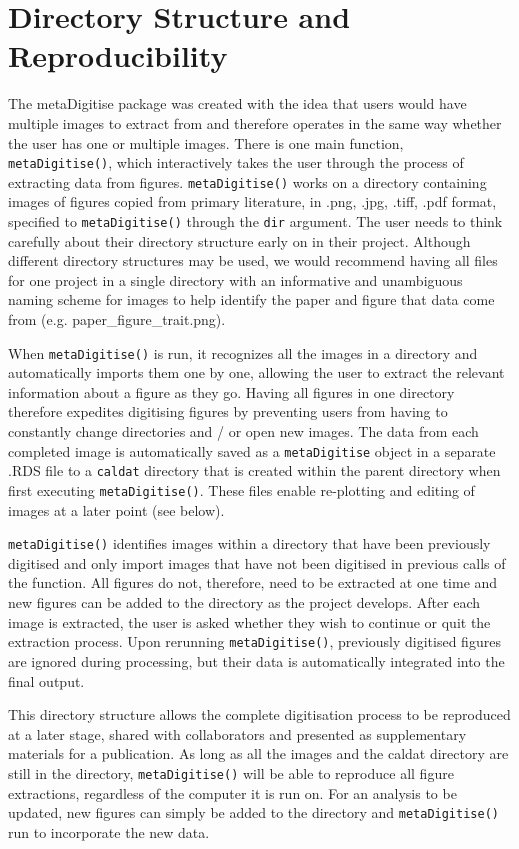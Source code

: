 \documentclass[12pt]{article}
\newcommand{\code}[1]{\texttt{#1}}
\newcommand{\fct}[1]{\texttt{#1()}}
\newcommand{\pkg}[1]{{\fontseries{b}\selectfont #1}}
\begin{document}
\section{Directory Structure and Reproducibility}
The \pkg{metaDigitise} package was created with the idea that users would have multiple images to extract from and therefore operates in the same way whether the user has one or multiple images. There is one main function, \fct{metaDigitise}, which interactively takes the user through the process of extracting data from figures. \fct{metaDigitise} works on a directory containing images of figures copied from primary literature, in .png, .jpg, .tiff, .pdf format, specified to \fct{metaDigitise} through the \code{dir} argument. The user needs to think carefully about their directory structure early on in their project. Although different directory structures may be used, we would recommend having all files for one project in a single directory with an informative and unambiguous naming scheme for images to help identify the paper and figure that data come from (e.g. paper_figure_trait.png).

When \fct{metaDigitise} is run, it recognizes all the images in a directory and automatically imports them one by one, allowing the user to extract the relevant information about a figure as they go. Having all figures in one directory therefore expedites digitising figures by preventing users from having to constantly change directories and / or open new images. The data from each completed image is automatically saved as a \code{metaDigitise} object in a separate .RDS file to a \code{caldat} directory that is created within the parent directory when first executing \fct{metaDigitise}. These files enable re-plotting and editing of images at a later point (see below).

\fct{metaDigitise} identifies images within a directory that have been previously digitised and only import images that have not been digitised in previous calls of the function. All figures do not, therefore, need to be extracted at one time and new figures can be added to the directory as the project develops. After each image is extracted, the user is asked whether they wish to continue or quit the extraction process. Upon rerunning \fct{metaDigitise}, previously digitised figures are ignored during processing, but their data is automatically integrated into the final output. 

This directory structure allows the complete digitisation process to be reproduced at a later stage, shared with collaborators and presented as supplementary materials for a publication. As long as all the images and the caldat directory are still in the directory, \fct{metaDigitise} will be able to reproduce all figure extractions, regardless of the computer it is run on. For an analysis to be updated, new figures can simply be added to the directory and \fct{metaDigitise} run to incorporate the new data. 
\end{document}
